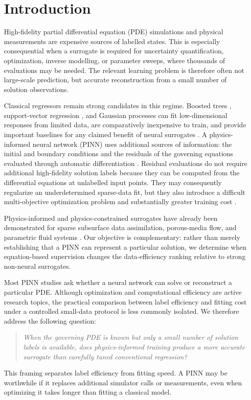 \section{Introduction}
\label{sec:introduction}

High-fidelity partial differential equation (PDE) simulations and physical measurements are expensive sources of labelled states. This is especially consequential when a surrogate is required for uncertainty quantification, optimization, inverse modelling, or parameter sweeps, where thousands of evaluations may be needed. The relevant learning problem is therefore often not large-scale prediction, but accurate reconstruction from a small number of solution observations.

Classical regressors remain strong candidates in this regime. Boosted trees \cite{chen2016xgboost}, support-vector regression \cite{drucker1997support}, and Gaussian processes \cite{rasmussen2006gaussian} can fit low-dimensional responses from limited data, are comparatively inexpensive to train, and provide important baselines for any claimed benefit of neural surrogates \cite{friedman2001greedy,chen2016xgboost,drucker1997support,rasmussen2006gaussian}. A physics-informed neural network (PINN) uses additional sources of information: the initial and boundary conditions and the residuals of the governing equations evaluated through automatic differentiation \cite{Raissi2019,Karniadakis2021}. Residual evaluations do not require additional high-fidelity solution labels because they can be computed from the differential equations at unlabelled input points. They may consequently regularize an underdetermined sparse-data fit, but they also introduce a difficult multi-objective optimization problem and substantially greater training cost \cite{Wang2022}.

Physics-informed and physics-constrained surrogates have already been demonstrated for sparse subsurface data assimilation, porous-media flow, and parametric fluid systems \cite{He2020,Hanna2022,Sun2020}. Our objective is complementary: rather than merely establishing that a PINN can represent a particular solution, we determine when equation-based supervision changes the data-efficiency ranking relative to strong non-neural surrogates.

Most PINN studies ask whether a neural network can solve or reconstruct a particular PDE. Although optimization and computational efficiency are active research topics, the practical comparison between label efficiency and fitting cost under a controlled small-data protocol is less commonly isolated. We therefore address the following question:
\begin{quote}
\emph{When the governing PDE is known but only a small number of solution labels is available, does physics-informed training produce a more accurate surrogate than carefully tuned conventional regression?}
\end{quote}
This framing separates label efficiency from fitting speed. A PINN may be worthwhile if it replaces additional simulator calls or measurements, even when optimizing it takes longer than fitting a classical model.

